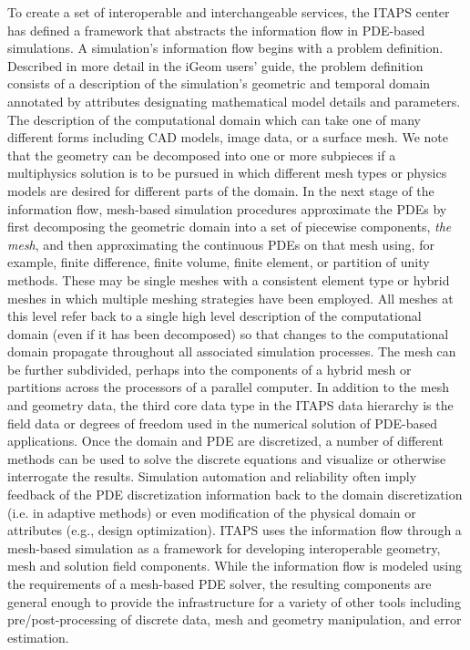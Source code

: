 \documentclass{article}
\begin{document}
To create a set of interoperable and interchangeable services, 
the ITAPS center has defined a framework that abstracts the information 
flow in PDE-based simulations. A simulation's information flow 
begins with a problem definition. Described in more detail in 
the iGeom users' guide, the problem definition consists of a 
description of the simulation's geometric and temporal domain 
annotated by attributes designating mathematical model details 
and parameters. The description of the computational domain which 
can take one of many different forms including CAD models, image 
data, or a surface mesh. We note that the geometry can be decomposed 
into one or more subpieces if a multiphysics solution is to be 
pursued in which different mesh types or physics models are desired 
for different parts of the domain. In the next stage of the information 
flow, mesh-based simulation procedures approximate the PDEs by 
first decomposing the geometric domain into a set of piecewise 
components, \emph{the mesh}, and then approximating the continuous 
PDEs on that mesh using, for example, finite difference, finite 
volume, finite element, or partition of unity methods. These 
may be single meshes with a consistent element type or hybrid 
meshes in which multiple meshing strategies have been employed. 
All meshes at this level refer back to a single high level description 
of the computational domain (even if it has been decomposed) 
so that changes to the computational domain propagate throughout 
all associated simulation processes. The mesh can be further 
subdivided, perhaps into the components of a hybrid mesh or partitions 
across the processors of a parallel computer. In addition to 
the mesh and geometry data, the third core data type in the ITAPS 
data hierarchy is the field data or degrees of freedom used in 
the numerical solution of PDE-based applications. Once the domain 
and PDE are discretized, a number of different methods can be 
used to solve the discrete equations and visualize or otherwise 
interrogate the results. Simulation automation and reliability 
often imply feedback of the PDE discretization information back 
to the domain discretization (i.e. in adaptive methods) or even 
modification of the physical domain or attributes (e.g., design 
optimization). ITAPS uses the information flow through a mesh-based 
simulation as a framework for developing interoperable geometry, 
mesh and solution field components. While the information flow 
is modeled using the requirements of a mesh-based PDE solver, 
the resulting components are general enough to provide the infrastructure 
for a variety of other tools including pre/post-processing of 
discrete data, mesh and geometry manipulation, and error estimation.
\end{document}
